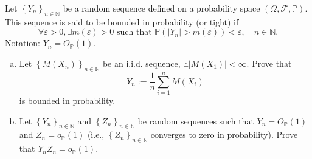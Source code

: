 \begin{ex}
    Let \(\left\{Y_{n}\right\}_{n \in \mathbb{N}}\) be a random sequence defined on a probability space \((\Omega, \mathcal{F}, \mathbb{P})\). This sequence is said to be bounded in probability (or tight) if
    \[
        \forall \varepsilon>0, \exists m(\varepsilon)>0 \text { such that } \mathbb{P}\left(\left|Y_{n}\right|>m(\varepsilon)\right)<\varepsilon, \quad n \in \mathbb{N} .
    \]
    Notation: \(Y_{n}=O_{\mathbb{P}}(1)\). 
    \begin{enumerate}[(a)]
        \item Let \(\left\{M\left(X_{n}\right)\right\}_{n \in \mathbb{N}}\) be an i.i.d. sequence, \(\mathbb{E}\left|M\left(X_{1}\right)\right|<\infty\). Prove that
        \[
        Y_{n}:=\frac{1}{n} \sum_{i=1}^{n} M\left(X_{i}\right)
        \]
        is bounded in probability. 
        \item Let \(\left\{Y_{n}\right\}_{n \in \mathbb{N}}\) and \(\left\{Z_{n}\right\}_{n \in \mathbb{N}}\) be random sequences such that \(Y_{n}=O_{\mathbb{P}}(1)\) and \(Z_{n}=o_{\mathbb{P}}(1)\) (i.e., \(\left\{Z_{n}\right\}_{n \in \mathbb{N}}\) converges to zero in probability). Prove that \(Y_{n} Z_{n}=o_{\mathbb{P}}(1)\). 
    \end{enumerate}
\end{ex}


